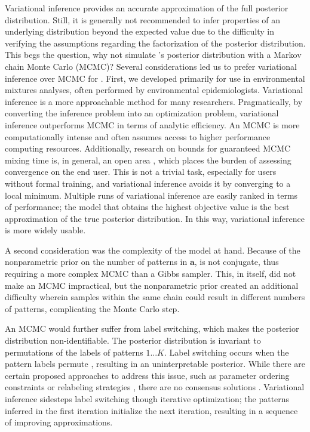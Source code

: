 Variational inference provides an accurate approximation of the full posterior distribution. Still, it is generally not recommended to infer properties of an underlying distribution beyond the expected value due to the difficulty in verifying the assumptions regarding the factorization of the posterior distribution. This begs the question, why not simulate \bnmfc's posterior distribution with a Markov chain Monte Carlo (MCMC)? Several considerations led us to prefer variational inference over MCMC for \bnmfc. First, we developed \bnmf primarily for use in environmental mixtures analyses, often performed by environmental epidemiologists. Variational inference is a more approachable method for many researchers. Pragmatically, by converting the inference problem into an optimization problem, variational inference outperforms MCMC in terms of analytic efficiency. An MCMC is more computationally intense and often assumes access to higher performance computing resources. Additionally, research on bounds for guaranteed MCMC mixing time is, in general, an open area \citep{levin2017markov}, which places the burden of assessing convergence on the end user. This is not a trivial task, especially for users without formal training, and variational inference avoids it by converging to a local minimum. Multiple runs of variational inference are easily ranked in terms of performance; the model that obtains the highest objective value is the best approximation of the true posterior distribution. In this way, variational inference is more widely usable. 

A second consideration was the complexity of the model at hand. Because of the nonparametric prior on the number of patterns in $\mathbf{a}$, \bnmf is not conjugate, thus requiring a more complex MCMC than a Gibbs sampler. This, in itself, did not make an MCMC impractical, but the nonparametric prior created an additional difficulty wherein samples within the same chain could result in different numbers of patterns, complicating the Monte Carlo step.

An MCMC would further suffer from label switching, which makes the posterior distribution non-identifiable. The posterior distribution is invariant to permutations of the labels of patterns $1 ... K$. Label switching occurs when the pattern labels permute \citep{celeux1998bayesian}, resulting in an uninterpretable posterior. While there are certain proposed approaches to address this issue, such as parameter ordering constraints or relabeling strategies \citep{rodriguez2014label}, there are no consensus solutions \citep{gelman06}. Variational inference sidesteps label switching though iterative optimization; the patterns inferred in the first iteration initialize the next iteration, resulting in a sequence of improving approximations.


